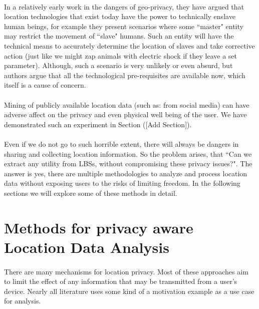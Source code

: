\documentclass{report}
\begin{document}
\paragraph{}
In a relatively early work \cite{dobson2003geoslavery} in the dangers of geo-privacy, they have argued that location technologies that exist today have the power to technically enslave human beings, for example they present scenarios where some ``master" entity may restrict the movement of ``slave" humans. Such an entity will have the technical means to accurately determine the location of slaves and take corrective action (just like we might zap animals with electric shock if they leave a set parameter). Although, such a scenario is very unlikely or even absurd, but authors argue that all the technological pre-requisites are available now, which itself is a cause of concern.

\paragraph{}
Mining of publicly available location data (such as: from social media) can have adverse affect on the privacy and even physical well being of the user. We have demonstrated such an experiment in Section ([Add Section]). 



\paragraph{}
Even if we do not go to such horrible extent, there will always be dangers in sharing and collecting location information. So the problem arises, that ``Can we extract any utility from LBSs, without compromising these privacy issues?". The answer is yes, there are multiple methodologies to analyze and process location data without exposing users to the risks of limiting freedom.  In the following sections we will explore some of these methods in detail.


\section{Methods for privacy aware Location Data Analysis}
\paragraph{}
There are many mechanisms for location privacy. Most of these approaches aim to limit the effect of any information that may be transmitted from a user's device. Nearly all literature uses some kind of a motivation example as a use case for analysis.
\end{document}
